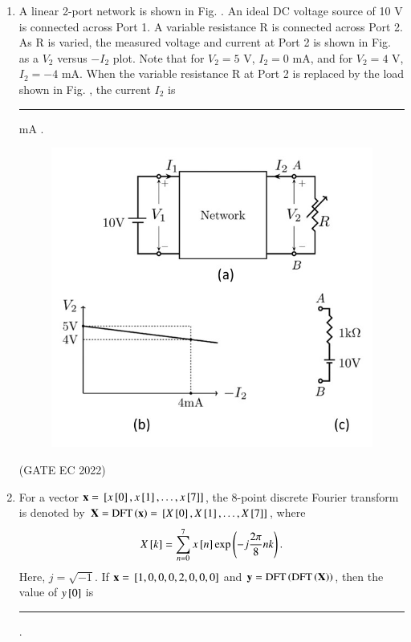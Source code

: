 \documentclass[journal,12pt,onecolumn]{IEEEtran}
\theoremstyle{remark}
\begin{document}
\begin{enumerate}
    \item A linear 2-port network is shown in Fig. .  An ideal DC voltage source of 10 V is connected across Port 1. A variable resistance R is connected across Port 2. As R is varied, the measured voltage and current at Port 2 is shown in Fig.  as a $V_2$ versus $-I_2$ plot. Note that for $V_2 = 5$ V, $I_2 = 0$ mA, and for $V_2 = 4$ V, $I_2 = -4$ mA.
    When the variable resistance R at Port 2 is replaced by the load shown in Fig. , the current $I_2$ is \rule{2cm}{0.4pt} mA .
    \begin{figure}[H]
        \centering
        \includegraphics[width=\columnwidth]{figs/m26.jpg}
        \caption*{}
        \label{fig:m26}
    \end{figure}
    
    \hfill{(GATE EC 2022)}

    \item For a vector $\mathbf{x} = {}\left[x{}\left[0\right], x{}\left[1\right], \dots, x{}\left[7\right]\right]$, the 8-point discrete Fourier transform  is denoted by $\mathbf{X} = \text{DFT}\left(\mathbf{x}\right) = {}\left[X{}\left[0\right], X{}\left[1\right], \dots, X{}\left[7\right]\right]$, where
    \begin{align*}
    X{}\left[k\right] = \sum_{n=0}^7 x{}\left[n\right] \exp\left(-j\frac{2\pi}{8}nk\right).
    \end{align*}
    Here, $j = \sqrt{-1}$. If $\mathbf{x} = {}\left[1, 0, 0, 0, 2, 0, 0, 0\right]$ and $\mathbf{y} = \text{DFT}\left(\text{DFT}\left(\mathbf{X}\right)\right)$, then the value of $y{}\left[0\right]$ is \rule{2cm}{0.4pt} .
    

\end{enumerate}
\end{document}
